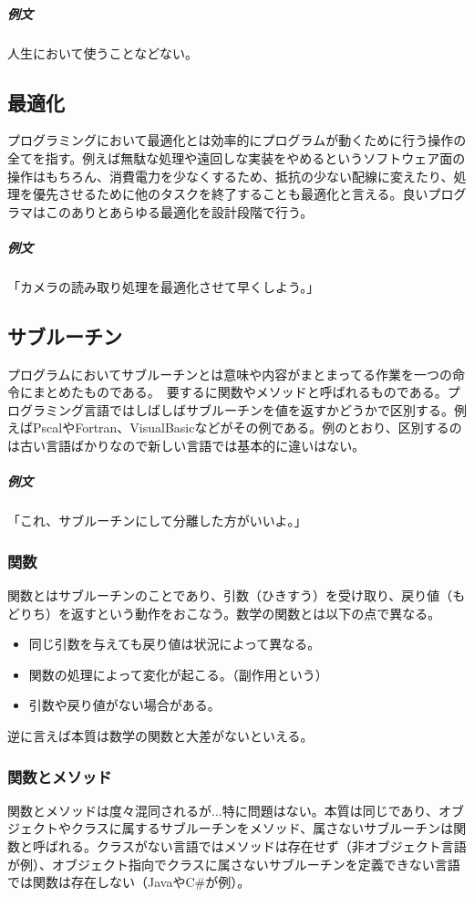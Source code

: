 \documentclass[a4paper]{ltjsreport}
\begin{document}
\subparagraph{例文} 人生において使うことなどない。

\subsection{最適化}
プログラミングにおいて最適化とは効率的にプログラムが動くために行う操作の全てを指す。例えば無駄な処理や遠回しな実装をやめるというソフトウェア面の操作はもちろん、消費電力を少なくするため、抵抗の少ない配線に変えたり、処理を優先させるために他のタスクを終了することも最適化と言える。良いプログラマはこのありとあらゆる最適化を設計段階で行う。

\subparagraph{例文} 「カメラの読み取り処理を最適化させて早くしよう。」

\subsection{サブルーチン}
プログラムにおいてサブルーチンとは意味や内容がまとまってる作業を一つの命令にまとめたものである。　要するに関数やメソッドと呼ばれるものである。プログラミング言語ではしばしばサブルーチンを値を返すかどうかで区別する。例えばPscalやFortran、VisualBasicなどがその例である。例のとおり、区別するのは古い言語ばかりなので新しい言語では基本的に違いはない。

\subparagraph{例文} 「これ、サブルーチンにして分離した方がいいよ。」

\subsubsection{関数}
関数とはサブルーチンのことであり、引数（ひきすう）を受け取り、戻り値（もどりち）を返すという動作をおこなう。数学の関数とは以下の点で異なる。

\begin{itemize}
  \item 同じ引数を与えても戻り値は状況によって異なる。
  \item 関数の処理によって変化が起こる。（副作用という）
  \item 引数や戻り値がない場合がある。
\end{itemize}

逆に言えば本質は数学の関数と大差がないといえる。

\subsubsection{関数とメソッド}
関数とメソッドは度々混同されるが...特に問題はない。本質は同じであり、オブジェクトやクラスに属するサブルーチンをメソッド、属さないサブルーチンは関数と呼ばれる。クラスがない言語ではメソッドは存在せず（非オブジェクト言語が例）、オブジェクト指向でクラスに属さないサブルーチンを定義できない言語では関数は存在しない（JavaやC\#が例）。
\end{document}
